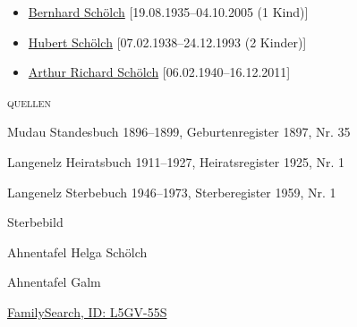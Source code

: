 \begin{person}[
    surname = {Schäfer},
    givenname = {Adelheid Anna},
    suffix = {1897--1959},
    label = {@I10@},
    filename = {Adelheid Anna Schaefer (1897)}
    ]
\begin{itemize}
\item \hyperref[@I62@]{Bernhard Schölch} [19.08.1935--04.10.2005 (1 Kind)]
\item \hyperref[@I65@]{Hubert Schölch} [07.02.1938--24.12.1993 (2 Kinder)]
\item \hyperref[@I66@]{Arthur Richard Schölch} [06.02.1940--16.12.2011]
\end{itemize}
\medbreak
\textsc{{quellen}}
\begin{enumerate}[label={[\arabic*]}]
\item Mudau Standesbuch 1896–1899, Geburtenregister 1897, Nr. 35
\item Langenelz Heiratsbuch 1911–1927, Heiratsregister 1925, Nr. 1
\item Langenelz Sterbebuch 1946–1973, Sterberegister 1959, Nr. 1
\item Sterbebild
\item Ahnentafel Helga Schölch
\item Ahnentafel Galm
\item \href{https://www.familysearch.org/tree/person/details/L5GV-55S}{FamilySearch, ID: L5GV-55S}
\end{enumerate}

\end{person}

